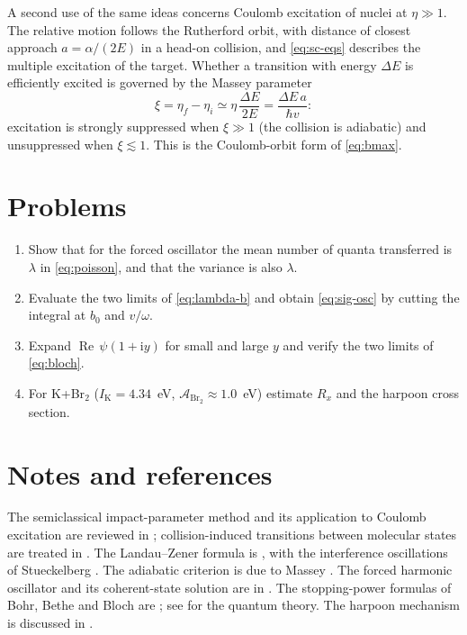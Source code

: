 \documentclass[11pt,a4paper]{book}
\numberwithin{equation}{chapter}
\newcommand{\ii}{\mathrm{i}}
\newcommand{\Real}{\operatorname{Re}}
\begin{document}
A second use of the same ideas concerns Coulomb excitation of nuclei at
$\eta\gg1$. The relative motion follows the Rutherford orbit, with distance of
closest approach $a=\alpha/(2E)$ in a head-on collision, and \eqref{eq:sc-eqs}
describes the multiple excitation of the target. Whether a transition with energy
$\Delta E$ is efficiently excited is governed by the Massey parameter
\begin{equation}\label{eq:xi-massey}
  \xi=\eta_f-\eta_i\simeq\eta\,\frac{\Delta E}{2E}=\frac{\Delta E\,a}{\hbar v}:
\end{equation}
excitation is strongly suppressed when $\xi\gg1$ (the collision is adiabatic)
and unsuppressed when $\xi\lesssim1$. This is the Coulomb-orbit form of
\eqref{eq:bmax}.

\section{Problems}
\begin{enumerate}
  \item Show that for the forced oscillator the mean number of quanta
        transferred is $\lambda$ in \eqref{eq:poisson}, and that the variance
        is also $\lambda$.
  \item Evaluate the two limits of \eqref{eq:lambda-b} and obtain
        \eqref{eq:sig-osc} by cutting the integral at $b_0$ and $v/\omega$.
  \item Expand $\Real\,\psi(1+\ii y)$ for small and large $y$ and verify the two
        limits of \eqref{eq:bloch}.
  \item For K+Br$_2$ ($I_{\mathrm K}=4.34$~eV, $\mathcal A_{\mathrm{Br_2}}\approx1.0$~eV)
        estimate $R_x$ and the harpoon cross section.
\end{enumerate}

\section*{Notes and references}
The semiclassical impact-parameter method and its application to Coulomb excitation are reviewed in \cite{Alder56,AlderWinther}; collision-induced transitions between molecular states are treated in \cite{MM,BM,Child,NU}. The Landau--Zener formula is \cite{Landau32,Zener32}, with the interference oscillations of Stueckelberg \cite{Stueckelberg32}. The adiabatic criterion is due to Massey \cite{Massey49}. The forced harmonic oscillator and its coherent-state solution are in \cite{Husimi53,Glauber63}. The stopping-power formulas of Bohr, Bethe and Bloch are \cite{Bohr13,Bethe30,Bloch33}; see \cite{Fano63,Inokuti71} for the quantum theory. The harpoon mechanism is discussed in \cite{LevineBernstein,Child}.
\end{document}
